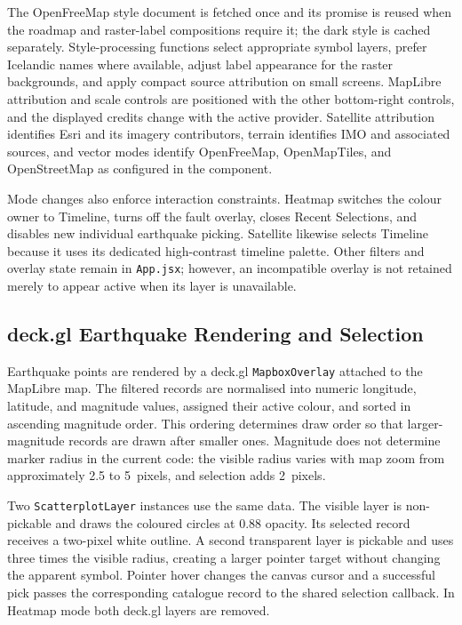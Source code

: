 \documentclass[12pt]{article}
\begin{document}
The OpenFreeMap style document is fetched once and its promise is reused when the roadmap and raster-label compositions require it; the dark style is cached separately. Style-processing functions select appropriate symbol layers, prefer Icelandic names where available, adjust label appearance for the raster backgrounds, and apply compact source attribution on small screens. MapLibre attribution and scale controls are positioned with the other bottom-right controls, and the displayed credits change with the active provider. Satellite attribution identifies Esri and its imagery contributors, terrain identifies IMO and associated sources, and vector modes identify OpenFreeMap, OpenMapTiles, and OpenStreetMap as configured in the component.

Mode changes also enforce interaction constraints. Heatmap switches the colour owner to Timeline, turns off the fault overlay, closes Recent Selections, and disables new individual earthquake picking. Satellite likewise selects Timeline because it uses its dedicated high-contrast timeline palette. Other filters and overlay state remain in \texttt{App.jsx}; however, an incompatible overlay is not retained merely to appear active when its layer is unavailable.

\subsection{deck.gl Earthquake Rendering and Selection}
\label{subsec:frontend_earthquake_rendering}

Earthquake points are rendered by a deck.gl \texttt{MapboxOverlay} attached to the MapLibre map. The filtered records are normalised into numeric longitude, latitude, and magnitude values, assigned their active colour, and sorted in ascending magnitude order. This ordering determines draw order so that larger-magnitude records are drawn after smaller ones. Magnitude does not determine marker radius in the current code: the visible radius varies with map zoom from approximately 2.5 to 5~pixels, and selection adds 2~pixels.

Two \texttt{ScatterplotLayer} instances use the same data. The visible layer is non-pickable and draws the coloured circles at 0.88 opacity. Its selected record receives a two-pixel white outline. A second transparent layer is pickable and uses three times the visible radius, creating a larger pointer target without changing the apparent symbol. Pointer hover changes the canvas cursor and a successful pick passes the corresponding catalogue record to the shared selection callback. In Heatmap mode both deck.gl layers are removed.
\end{document}
